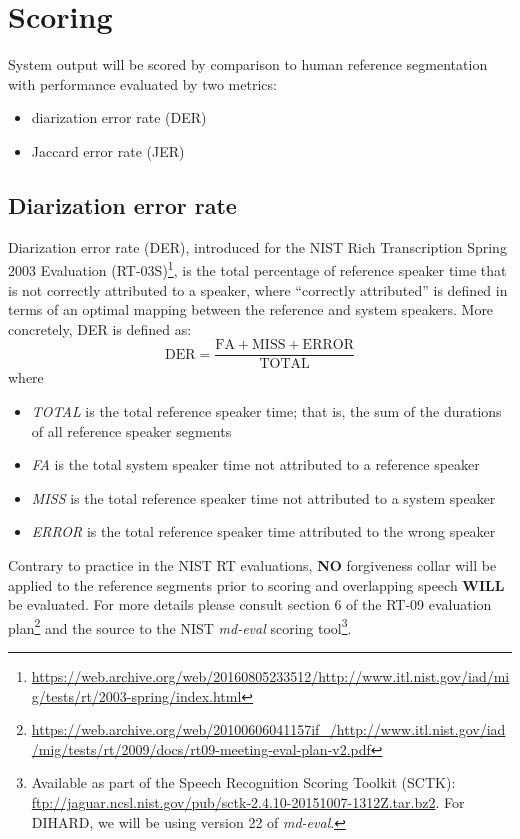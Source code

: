\documentclass{article}
\begin{document}
\section{Scoring}
System output will be scored by comparison to human reference segmentation with performance evaluated by two metrics:
    \begin{itemize}
        \item diarization error rate (DER)
        \item Jaccard error rate (JER) 
    \end{itemize}

\subsection{Diarization error rate}
Diarization error rate (DER), introduced for the NIST Rich Transcription Spring 2003 Evaluation (RT-03S)\footnote{\url{https://web.archive.org/web/20160805233512/http://www.itl.nist.gov/iad/mig/tests/rt/2003-spring/index.html}}, is the total percentage of reference speaker time that is not correctly attributed to a speaker, where ``correctly attributed'' is defined in terms of an optimal mapping between the reference and system speakers. More concretely, DER is defined as: 
\begin{equation*}
    \textrm{DER} = \frac{\textrm{FA} + \textrm{MISS} + \textrm{ERROR}}{\textrm{TOTAL}}
\end{equation*}
where
\begin{itemize}
    \item {\it TOTAL} is the total reference speaker time; that is, the sum of the durations of all reference speaker segments
    \item {\it FA} is the total system speaker time not attributed to a reference speaker
    \item {\it MISS} is the total reference speaker time not attributed to a system speaker
    \item {\it ERROR} is the total reference speaker time attributed to the wrong speaker
\end{itemize}
Contrary to practice in the NIST RT evaluations, {\bf NO} forgiveness collar will be applied to the reference segments prior to scoring and overlapping speech {\bf WILL} be evaluated. For more details please consult section 6 of the RT-09 evaluation plan\footnote{\url{https://web.archive.org/web/20100606041157if_/http://www.itl.nist.gov/iad/mig/tests/rt/2009/docs/rt09-meeting-eval-plan-v2.pdf}} and the source to the NIST {\it md-eval} scoring tool\footnote{Available as part of the Speech Recognition Scoring Toolkit (SCTK): \url{ftp://jaguar.ncsl.nist.gov/pub/sctk-2.4.10-20151007-1312Z.tar.bz2}. For DIHARD, we will be using version 22 of {\it md-eval}.}.
\end{document}
